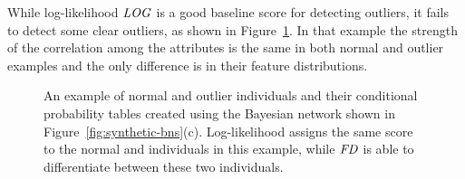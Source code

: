 {While log-likelihood $\it{LOG}$ is a good baseline score for detecting outliers, it fails to detect some clear outliers, as shown in Figure~\ref{fig:logfails}. In that example the strength of the correlation among the attributes is the same in both normal and outlier examples and the only difference is in their feature distributions.

		\begin{figure*}[htbp]
			\centering
			\caption{An example of normal and outlier individuals and their conditional probability tables created using the Bayesian network shown in Figure~\ref{fig:synthetic-bns}(c). Log-likelihood assigns the same score to the normal and individuals in this example, while $\it{FD}$ is able to differentiate between these two individuals.
				\label{fig:logfails}}
		\end{figure*}
		



}
